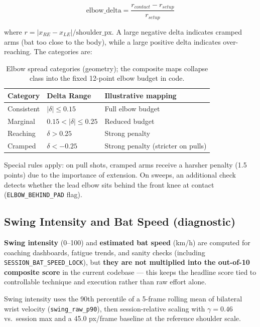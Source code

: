 \begin{justify}
\begin{equation}
    \text{elbow\_delta} = \frac{r_{contact} - r_{setup}}{r_{setup}}
\end{equation}

where $r = |x_{RE} - x_{LE}| / \text{shoulder\_px}$. A large negative delta indicates cramped arms (bat too close to the body), while a large positive delta indicates over-reaching. The categories are:

\begin{table}[ht]
\centering
\caption[Elbow spread categories.]{Elbow spread categories (geometry); the composite maps collapse class into the fixed 12-point elbow budget in code.}
\label{tab:elbow}
\begin{tabular}{l l l}
 \hline
 \textbf{Category} & \textbf{Delta Range} & \textbf{Illustrative mapping} \\
 \hline
 Consistent & $|\delta| \leq 0.15$ & Full elbow budget \\
 Marginal & $0.15 < |\delta| \leq 0.25$ & Reduced budget \\
 Reaching & $\delta > 0.25$ & Strong penalty \\
 Cramped & $\delta < -0.25$ & Strong penalty (stricter on pulls) \\
 \hline
\end{tabular}
\end{table}

\par Special rules apply: on pull shots, cramped arms receive a harsher penalty (1.5 points) due to the importance of extension. On sweeps, an additional check detects whether the lead elbow sits behind the front knee at contact (\texttt{ELBOW\_BEHIND\_PAD} flag).

\subsection{Swing Intensity and Bat Speed (diagnostic)}

\par \textbf{Swing intensity} (0--100) and \textbf{estimated bat speed} (km/h) are computed for coaching dashboards, fatigue trends, and sanity checks (including \texttt{SESSION\_BAT\_SPEED\_LOCK}), but \textbf{they are not multiplied into the out-of-10 composite score} in the current codebase — this keeps the headline score tied to controllable technique and execution rather than raw effort alone.

\par Swing intensity uses the 90th percentile of a 5-frame rolling mean of bilateral wrist velocity (\texttt{swing\_raw\_p90}), then session-relative scaling with $\gamma = 0.46$ vs.\ session max and a 45.0 px/frame baseline at the reference shoulder scale.


\end{justify}
